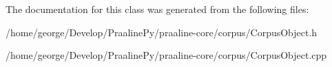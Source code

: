 The documentation for this class was generated from the following files\+:\begin{DoxyCompactItemize}
\item 
/home/george/\+Develop/\+Praaline\+Py/praaline-\/core/corpus/Corpus\+Object.\+h\item 
/home/george/\+Develop/\+Praaline\+Py/praaline-\/core/corpus/Corpus\+Object.\+cpp\end{DoxyCompactItemize}
